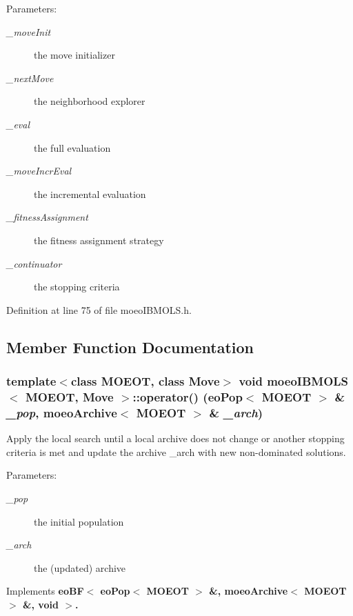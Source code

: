 \begin{Desc}
\item[Parameters:]
\begin{description}
\item[{\em \_\-move\-Init}]the move initializer \item[{\em \_\-next\-Move}]the neighborhood explorer \item[{\em \_\-eval}]the full evaluation \item[{\em \_\-move\-Incr\-Eval}]the incremental evaluation \item[{\em \_\-fitness\-Assignment}]the fitness assignment strategy \item[{\em \_\-continuator}]the stopping criteria \end{description}
\end{Desc}


Definition at line 75 of file moeo\-IBMOLS.h.

\subsection{Member Function Documentation}
\subsubsection{\setlength{\rightskip}{0pt plus 5cm}template$<$class MOEOT, class Move$>$ void \bf{moeo\-IBMOLS}$<$ MOEOT, Move $>$::operator() (\bf{eo\-Pop}$<$ MOEOT $>$ \& {\em \_\-pop}, \bf{moeo\-Archive}$<$ MOEOT $>$ \& {\em \_\-arch})\hspace{0.3cm}{\tt  [inline, virtual]}}\label{classmoeoIBMOLS_fd788bbc4f956dec932dba2a4d4479b6}


Apply the local search until a local archive does not change or another stopping criteria is met and update the archive \_\-arch with new non-dominated solutions. 

\begin{Desc}
\item[Parameters:]
\begin{description}
\item[{\em \_\-pop}]the initial population \item[{\em \_\-arch}]the (updated) archive \end{description}
\end{Desc}


Implements \bf{eo\-BF$<$ eo\-Pop$<$ MOEOT $>$ \&, moeo\-Archive$<$ MOEOT $>$ \&, void $>$}.

